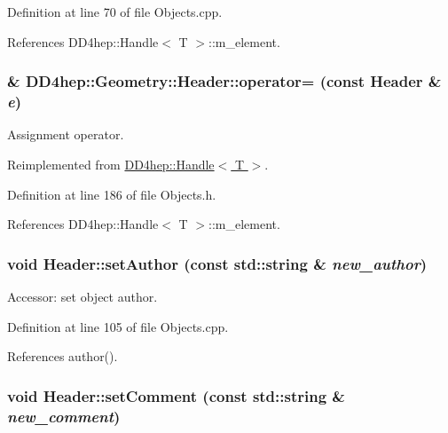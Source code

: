 Definition at line 70 of file Objects.cpp.

References DD4hep::Handle$<$ T $>$::m\_\-element.\hypertarget{class_d_d4hep_1_1_geometry_1_1_header_acc0a56dbbdcf868bccd82d1bc8216821}{
\subsubsection[{operator=}]{\& DD4hep::Geometry::Header::operator= (const {\bf Header} \& {\em e})}}
\label{class_d_d4hep_1_1_geometry_1_1_header_acc0a56dbbdcf868bccd82d1bc8216821}


Assignment operator. 

Reimplemented from \hyperlink{class_d_d4hep_1_1_handle_a9bbf8f498df42e81ad26fb00233505a6}{DD4hep::Handle$<$ T $>$}.

Definition at line 186 of file Objects.h.

References DD4hep::Handle$<$ T $>$::m\_\-element.\hypertarget{class_d_d4hep_1_1_geometry_1_1_header_a7efa4948ea5e1a980bc15a88522f7618}{
\subsubsection[{setAuthor}]{\setlength{\rightskip}{0pt plus 5cm}void Header::setAuthor (const std::string \& {\em new\_\-author})}}
\label{class_d_d4hep_1_1_geometry_1_1_header_a7efa4948ea5e1a980bc15a88522f7618}


Accessor: set object author. 

Definition at line 105 of file Objects.cpp.

References author().\hypertarget{class_d_d4hep_1_1_geometry_1_1_header_afd7df593939068d26d155478d6350481}{
\subsubsection[{setComment}]{\setlength{\rightskip}{0pt plus 5cm}void Header::setComment (const std::string \& {\em new\_\-comment})}}
\label{class_d_d4hep_1_1_geometry_1_1_header_afd7df593939068d26d155478d6350481}


